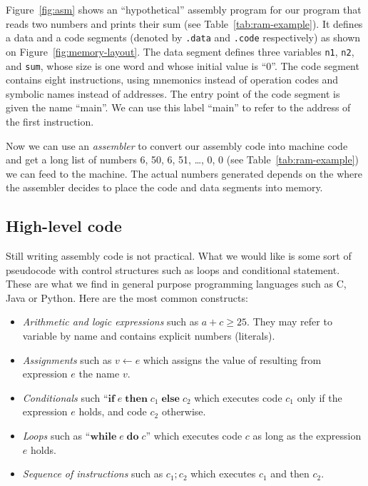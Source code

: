 \documentclass {aldast}
\begin{document}
Figure~\ref{fig:asm} shows an ``hypothetical'' assembly
program for our program that reads
two numbers and prints their sum (see Table~\ref{tab:ram-example}). It
defines a data and a code segments (denoted by \texttt{.data} and
\texttt{.code} respectively) as shown on
Figure~\ref{fig:memory-layout}. The data segment defines three
variables \texttt{n1}, \texttt{n2}, and \texttt{sum}, whose size is
one word and whose initial value is ``0''. The code segment contains
eight instructions, using mnemonics instead of operation codes and
symbolic names instead of addresses. The entry point of the code
segment is given the name ``main''. We can use this label ``main'' to
refer to the address of the first instruction.

Now we can use an \emph{assembler} to convert our
assembly code into machine code and get a long list of numbers 6, 50,
6, 51, \ldots, 0, 0 (see Table~\ref{tab:ram-example}) we can feed to
the machine. The actual numbers generated depends on the where the
assembler decides to place the code and data segments into memory.


\subsection{High-level code}

Still writing assembly code is not practical. What we would like is
some sort of pseudocode with control structures such as loops and
conditional statement. These are what we find in general purpose
programming languages such as C, Java or Python. Here are the most
common constructs:
\begin{itemize}
\item \emph{Arithmetic and logic expressions} such as $a + c \geq
  25$. They may refer to variable by name and contains explicit numbers
  (literals).
\item \emph{Assignments} such as $v \gets e$ which assigns the value
  of resulting from expression $e$ the name $v$.
\item \emph{Conditionals} such
  ``$\mathbf{if} \; e \; \mathbf{then} \; c_1 \; \mathbf{else} \; c_2$ which
  executes code $c_1$ only if the expression $e$ holds, and code $c_2$
  otherwise.
\item \emph{Loops} such as ``$\mathbf{while} \; e \; \mathbf{do} \; c$'' which
  executes code $c$ as long as the expression $e$ holds.
\item \emph{Sequence of instructions} such as $c_1 ; c_2$ which
  executes $c_1$ and then $c_2$.
\end{itemize}
\end{document}
